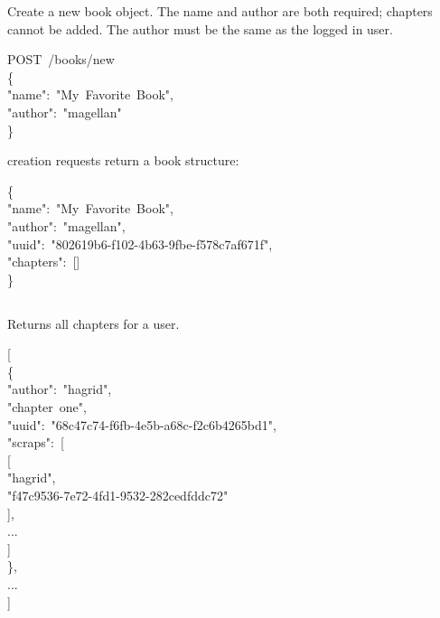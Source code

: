 \documentclass[onecolumn, draftclsnofoot, 10pt, compsoc]{IEEEtran}
\begin{document}
\noindent Create a new book object. The name and author are both required; chapters
cannot be added. The author must be the same as the logged in user.%
\begin{mdpre}%
\noindent POST~/books/new\\
\{\\
"name":~"My~Favorite~Book",\\
"author":~"magellan"\\
\}%
\end{mdpre}\noindent{} creation requests return a book structure:
\begin{mdpre}%
\noindent\{\\
"name":~"My~Favorite~Book",\\
"author":~"magellan",\\
"uuid":~"802619b6-f102-4b63-9fbe-f578c7af671f",\\
"chapters":~{}[]\\
\}%
\end{mdpre}
\subsection{}\label{sec-chapters}%

\subsubsection{}\label{sec-get-chaptersauthor}%

\noindent Returns all chapters for a user.%
\begin{mdpre}%
\noindent{}[\\
\{\\
"author":~"hagrid",\\
"chapter~one",\\
"uuid":~"68c47c74-f6fb-4e5b-a68c-f2c6b4265bd1",\\
"scraps":~{}[\\
[\\
"hagrid",\\
"f47c9536-7e72-4fd1-9532-282cedfddc72"\\
],\\
...\\
]\\
\},\\
...\\
]%
\end{mdpre}
\end{document}
